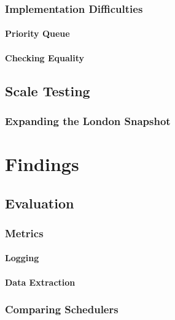 \documentclass[a4paper,11pt,titlepage]{report}
\begin{document}
\section{Implementation Difficulties}
\subsection{Priority Queue}
\subsection{Checking Equality}


\newpage
\chapter{Scale Testing}
\section{Expanding the London Snapshot}
\section{}


\newpage
\part{Findings}
\chapter{Evaluation}
\section{Metrics}
\subsection{Logging}
\subsection{Data Extraction}

\section{Comparing Schedulers}
\end{document}
